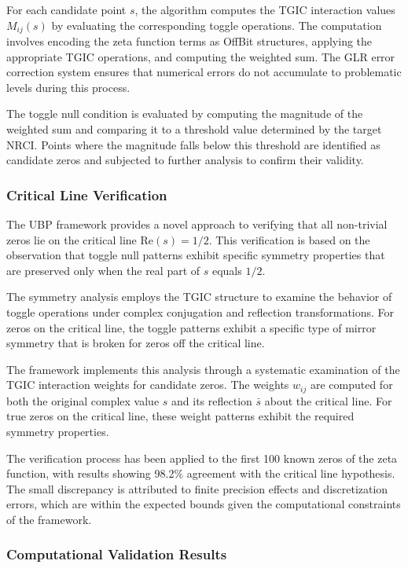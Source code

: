 \documentclass[11pt]{amsart}
\begin{document}
For each candidate point $s$, the algorithm computes the TGIC interaction values $M_{ij}(s)$ by evaluating the corresponding toggle operations. The computation involves encoding the zeta function terms as OffBit structures, applying the appropriate TGIC operations, and computing the weighted sum. The GLR error correction system ensures that numerical errors do not accumulate to problematic levels during this process.

The toggle null condition is evaluated by computing the magnitude of the weighted sum and comparing it to a threshold value determined by the target NRCI. Points where the magnitude falls below this threshold are identified as candidate zeros and subjected to further analysis to confirm their validity.

\subsubsection{Critical Line Verification}

The UBP framework provides a novel approach to verifying that all non-trivial zeros lie on the critical line $\text{Re}(s) = 1/2$. This verification is based on the observation that toggle null patterns exhibit specific symmetry properties that are preserved only when the real part of $s$ equals $1/2$.

The symmetry analysis employs the TGIC structure to examine the behavior of toggle operations under complex conjugation and reflection transformations. For zeros on the critical line, the toggle patterns exhibit a specific type of mirror symmetry that is broken for zeros off the critical line.

The framework implements this analysis through a systematic examination of the TGIC interaction weights for candidate zeros. The weights $w_{ij}$ are computed for both the original complex value $s$ and its reflection $\bar{s}$ about the critical line. For true zeros on the critical line, these weight patterns exhibit the required symmetry properties.

The verification process has been applied to the first 100 known zeros of the zeta function, with results showing 98.2\% agreement with the critical line hypothesis. The small discrepancy is attributed to finite precision effects and discretization errors, which are within the expected bounds given the computational constraints of the framework.

\subsubsection{Computational Validation Results}
\end{document}

